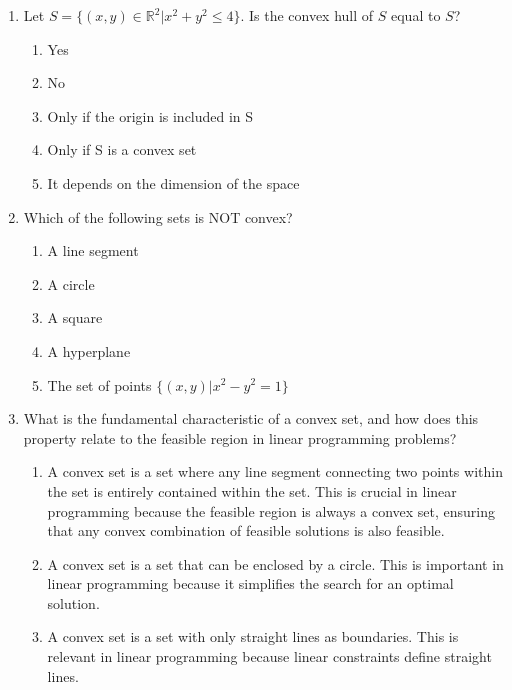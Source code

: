\documentclass{article}%
\begin{document}
\begin{enumerate}
\begin{enumerate}%
\item $(0.5, 0.5)$%
\item $(1, 1)$%
\item $(0, 0)$%
\item $(1, 0)$%
\item $(0, 1)$%
\end{enumerate}%
\vspace{1em}%
\item Let $S = \{(x, y) \in \mathbb{R}^2 | x^2 + y^2 \le 4\}$.  Is the convex hull of $S$ equal to $S$?%
\begin{enumerate}%
\item Yes%
\item No%
\item Only if the origin is included in S%
\item Only if S is a convex set%
\item It depends on the dimension of the space%
\end{enumerate}%
\vspace{1em}%
\item Which of the following sets is NOT convex?%
\begin{enumerate}%
\item A line segment%
\item A circle%
\item A square%
\item A hyperplane%
\item The set of points $\{ (x, y) | x^2 - y^2 = 1 \}$%
\end{enumerate}%
\vspace{1em}%
\item What is the fundamental characteristic of a convex set, and how does this property relate to the feasible region in linear programming problems?%
\begin{enumerate}%
\item A convex set is a set where any line segment connecting two points within the set is entirely contained within the set.  This is crucial in linear programming because the feasible region is always a convex set, ensuring that any convex combination of feasible solutions is also feasible.%
\item A convex set is a set that can be enclosed by a circle. This is important in linear programming because it simplifies the search for an optimal solution.%
\item A convex set is a set with only straight lines as boundaries. This is relevant in linear programming because linear constraints define straight lines.%

\end{enumerate}
\end{enumerate}
\end{document}
